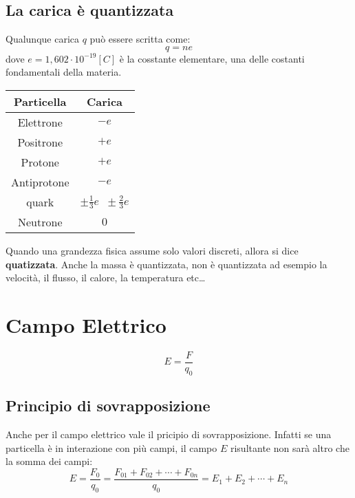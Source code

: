         \subsection{La carica è quantizzata} Qualunque carica $q$ può essere
        scritta come:
            \begin{equation}
                q = ne
            \end{equation}
        dove $e = 1,602\cdot10^{-19} [C]$ è la cosstante elementare, una delle
        costanti fondamentali della materia.
        \begin{center}
            \begin{tabular}{ |c|c| } 
                \hline
                Particella & Carica \\
                \hline
                Elettrone & $- e$ \\
                Positrone & $+ e$ \\
                Protone & $+ e$ \\
                Antiprotone & $- e$ \\
                quark & $\pm \frac{1}{3}e \;\; \pm \frac{2}{3}e$ \\
                Neutrone & $0$ \\
                \hline
            \end{tabular}
        \end{center}
        Quando una grandezza fisica assume solo valori discreti, allora si dice
        \textbf{quatizzata}. Anche la massa è quantizzata, non è quantizzata ad
        esempio la velocità, il flusso, il calore, la temperatura etc\dots

        \section{Campo Elettrico}
            \begin{equation}
                E = \frac{F}{q_0}
            \end{equation}

            \subsection{Principio di sovrapposizione} Anche per il campo 
            elettrico vale il pricipio di sovrapposizione. Infatti se una 
            particella è in interazione con più campi, il campo $E$ risultante
            non sarà altro che la somma dei campi:
                \begin{equation}
                    E = \frac{F_0}{q_0} = \frac{F_{01} + F_{02} + \cdots + 
                    F_{0n}}{q_0} = E_1 + E_2 + \cdots + E_n
                \end{equation}

